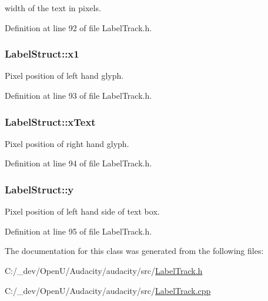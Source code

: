 width of the text in pixels. 



Definition at line 92 of file Label\+Track.\+h.

\subsubsection[{\texorpdfstring{x1}{x1}}]{ Label\+Struct\+::x1}\hypertarget{class_label_struct_a1e7175fc196b30358b92d4bae7f5dad6}{}\label{class_label_struct_a1e7175fc196b30358b92d4bae7f5dad6}


Pixel position of left hand glyph. 



Definition at line 93 of file Label\+Track.\+h.

\subsubsection[{\texorpdfstring{x\+Text}{xText}}]{ Label\+Struct\+::x\+Text}\hypertarget{class_label_struct_af7b2252912f4b3999465c8a37c58e30e}{}\label{class_label_struct_af7b2252912f4b3999465c8a37c58e30e}


Pixel position of right hand glyph. 



Definition at line 94 of file Label\+Track.\+h.

\subsubsection[{\texorpdfstring{y}{y}}]{ Label\+Struct\+::y}\hypertarget{class_label_struct_afebbf0cbb153813c8bd73eb362647736}{}\label{class_label_struct_afebbf0cbb153813c8bd73eb362647736}


Pixel position of left hand side of text box. 



Definition at line 95 of file Label\+Track.\+h.



The documentation for this class was generated from the following files\+:\begin{DoxyCompactItemize}
\item 
C\+:/\+\_\+dev/\+Open\+U/\+Audacity/audacity/src/\hyperlink{_label_track_8h}{Label\+Track.\+h}\item 
C\+:/\+\_\+dev/\+Open\+U/\+Audacity/audacity/src/\hyperlink{_label_track_8cpp}{Label\+Track.\+cpp}\end{DoxyCompactItemize}
